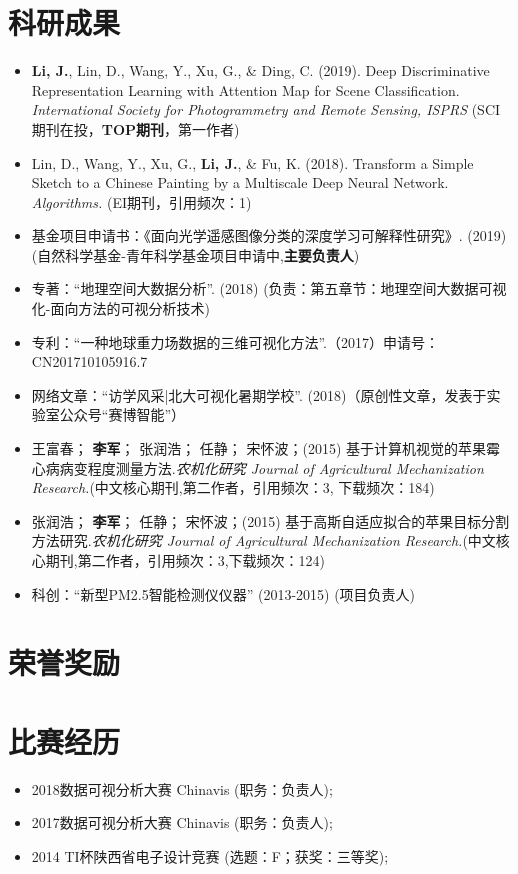 \documentclass{resume}
\begin{document}
\section{科研成果}
\begin{itemize}[parsep=0.5ex]
  \item \textbf{Li, J.}, Lin, D., Wang, Y., Xu, G., \& Ding, C. (2019). Deep Discriminative Representation Learning with Attention Map for Scene Classification. \textit{International Society for Photogrammetry and Remote Sensing, ISPRS} (SCI期刊在投，\textbf{TOP期刊}，第一作者)
  \item Lin, D., Wang, Y., Xu, G., \textbf{Li, J.}, \& Fu, K. (2018). Transform a Simple Sketch to a Chinese Painting by a Multiscale Deep Neural Network. \textit{Algorithms.} (EI期刊，引用频次：1)
  \item 基金项目申请书：《面向光学遥感图像分类的深度学习可解释性研究》. (2019) (自然科学基金-青年科学基金项目申请中,\textbf{主要负责人})
  \item 专著：“地理空间大数据分析”. (2018)  (负责：第五章节：地理空间大数据可视化-面向方法的可视分析技术)
  \item 专利：“一种地球重力场数据的三维可视化方法”.（2017）申请号：CN201710105916.7
  \item 网络文章：“访学风采|北大可视化暑期学校”. (2018)（原创性文章，发表于实验室公众号“赛博智能”）
  \item 王富春； \textbf{李军}； 张润浩； 任静； 宋怀波；(2015) 基于计算机视觉的苹果霉心病病变程度测量方法.\textit{农机化研究 Journal of Agricultural Mechanization Research.}(中文核心期刊,第二作者，引用频次：3, 下载频次：184)
  \item  张润浩； \textbf{李军}； 任静； 宋怀波；(2015) 基于高斯自适应拟合的苹果目标分割方法研究.\textit{农机化研究 Journal of Agricultural Mechanization Research.}(中文核心期刊,第二作者，引用频次：3,下载频次：124)
  \item 科创：“新型PM2.5智能检测仪仪器” (2013-2015) (项目负责人)
\end{itemize}

\section{荣誉奖励}


\section{比赛经历}
\begin{itemize}[parsep=0.5ex]
	\item 2018数据可视分析大赛 Chinavis (职务：负责人);
	\item 2017数据可视分析大赛 Chinavis (职务：负责人);
	\item 2014 TI杯陕西省电子设计竞赛 (选题：F；获奖：三等奖);
\end{itemize}
\end{document}
